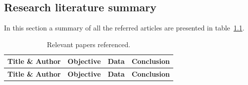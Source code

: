 %
%
%
%

\setlength{\footskip}{8mm}

\begin{landscape}
	\chapter{Research literature summary}
In this section a summary of all the referred articles are presented in table~\ref{my-label}.

	\hskip-5.0cm 
	\begin{longtable}[c]{|p{4cm}|p{6cm}|p{4cm}|p{6cm}|}
				\caption{Relevant papers referenced.\label{my-label}}\\
		\hline
				\rowcolor[HTML]{000000} 
				{\color[HTML]{FFFFFF} \textbf{Title \& Author}} & {\color[HTML]{FFFFFF} \textbf{Objective}} & {\color[HTML]{FFFFFF} \textbf{Data}} & {\color[HTML]{FFFFFF} \textbf{Conclusion}} \\ \hline
		\endfirsthead
		
		\hline
				\rowcolor[HTML]{000000} 
				{\color[HTML]{FFFFFF} \textbf{Title \& Author}} & {\color[HTML]{FFFFFF} \textbf{Objective}} & {\color[HTML]{FFFFFF} \textbf{Data}} & {\color[HTML]{FFFFFF} \textbf{Conclusion}} \\ \hline
		\hline
		\endhead
		
		

\end{longtable}
\end{landscape}
